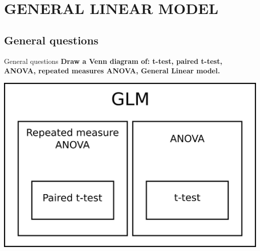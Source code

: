 \documentclass{beamer}
\begin{document}

\section{GENERAL LINEAR MODEL}

\subsection[General questions]{General questions}


\begin{frame}{General questions}
\textbf{Draw a Venn diagram of: t-test, paired t-test, ANOVA, repeated measures ANOVA, General Linear model.}

\smallskip
    \begin{center}
      \includegraphics[scale=0.5,keepaspectratio=true]{./Venn_GLM.jpg}
    \end{center}
\end{frame} 
\end{document}
